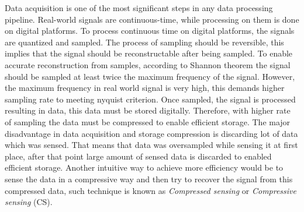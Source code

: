 Data acquisition is one of the most significant steps in any data processing pipeline.  Real-world signals are continuous-time, while processing on them is done on digital platforms. To process continuous time on digital platforms, the signals are quantized and sampled. The process of sampling should be reversible, this implies that the signal should be reconstructable after being sampled. To enable accurate reconstruction from samples, according to Shannon theorem the signal should be sampled at least twice the maximum frequency of the signal. However, the maximum frequency in real world signal is very high, this demands higher sampling rate to meeting nyquist criterion. Once sampled, the signal is processed resulting in data, this data must be stored digitally. Therefore, with higher rate of sampling the data must be compressed to enable efficient storage. The major disadvantage in data acquisition and storage compression is discarding lot of data which was sensed. That means that data was oversampled while sensing it at first place, after that point large amount of sensed data is discarded to enabled efficient storage.  Another intuitive way to achieve more efficiency would be to sense the data in a compressive way and then try to recover the signal from this compressed data, such technique is known as \textit{Compressed sensing} or  \textit{Compressive sensing} (CS). 
